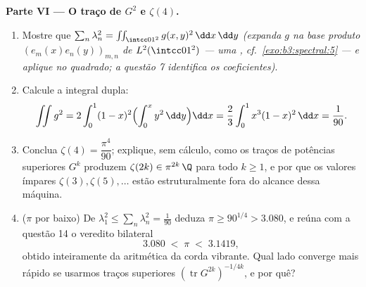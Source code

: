 \begin{problem}
\medskip
\noindent\textbf{Parte VI --- O traço de $G^2$ e $\zeta(4)$.}
\begin{enumerate}[resume]
  \item Mostre que $\sum_n\lambda_n^2 =
        \iint_{\intcc01^2}g(x,y)^2\,\dd x\,\dd y$ \emph{(expanda $g$ na base produto $(e_m(x)e_n(y))_{m,n}$ de
        $L^2(\intcc01^2)$ --- uma , cf.\ \cref{exo:b3:spectral:5} --- e aplique
         no quadrado; a questão 7 identifica os coeficientes)}.
  \item Calcule a integral dupla:
        \[
        \iint g^2 = 2\int_0^1(1-x)^2\Bigl(\int_0^x
        y^2\,\dd y\Bigr)\dd x
        = \frac23\int_0^1x^3(1-x)^2\,\dd x = \frac1{90} .
        \]
  \item Conclua $\zeta(4) = \dfrac{\pi^4}{90}$; explique, sem cálculo, como os traços de
        potências superiores $G^k$ produzem $\zeta(2k) \in \pi^{2k}\,\Q$ para todo $k \geq 1$, e
        por que os valores ímpares $\zeta(3),
        \zeta(5), \dots$ estão estruturalmente fora do
        alcance dessa máquina.
  \item ($\pi$ por baixo) De $\lambda_1^2 \leq
        \sum_n\lambda_n^2 = \frac1{90}$ deduza $\pi \geq
        90^{1/4} > 3.080$, e reúna com a
        questão 14 o veredito bilateral
        \[
        3.080 \;<\; \pi \;<\; 3.1419,
        \]
        obtido inteiramente da aritmética da corda vibrante. Qual lado
        converge mais rápido se usarmos traços superiores $(\operatorname{tr}G^{2k})^{-1/4k}$, e por
        quê?
\end{enumerate}


\end{problem}
